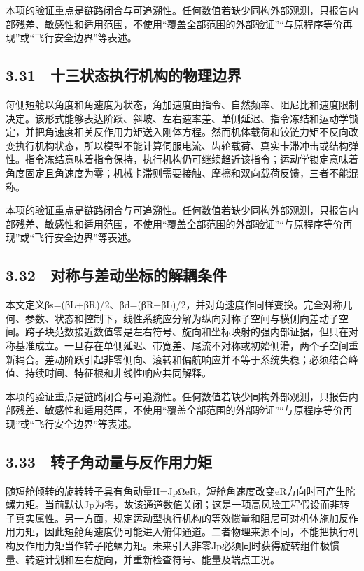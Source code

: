 \documentclass[UTF8,12pt,openany]{ctexbook}
\begin{document}
本项的验证重点是链路闭合与可追溯性。任何数值若缺少同构外部观测，只报告内部残差、敏感性和适用范围，不使用“覆盖全部范围的外部验证”“与原程序等价再现”或“飞行安全边界”等表述。

\subsection{3.31　十三状态执行机构的物理边界}

每侧短舱以角度和角速度为状态，角加速度由指令、自然频率、阻尼比和速度限制决定。该形式能够表达阶跃、斜坡、左右速率差、单侧延迟、指令冻结和运动学锁定，并把角速度相关反作用力矩送入刚体方程。然而机体载荷和铰链力矩不反向改变执行机构状态，所以模型不能计算伺服电流、齿轮载荷、真实卡滞冲击或结构弹性。指令冻结意味着指令保持，执行机构仍可继续趋近该指令；运动学锁定意味着角度固定且角速度为零；机械卡滞则需要接触、摩擦和双向载荷反馈，三者不能混称。

本项的验证重点是链路闭合与可追溯性。任何数值若缺少同构外部观测，只报告内部残差、敏感性和适用范围，不使用“覆盖全部范围的外部验证”“与原程序等价再现”或“飞行安全边界”等表述。

\subsection{3.32　对称与差动坐标的解耦条件}

本文定义βs=(βL+βR)/2、βd=(βR−βL)/2，并对角速度作同样变换。完全对称几何、参数、状态和控制下，线性系统应分解为纵向对称子空间与横侧向差动子空间。跨子块范数接近数值零是左右符号、旋向和坐标映射的强内部证据，但只在对称基准成立。一旦存在单侧延迟、带宽差、尾流不对称或初始侧滑，两个子空间重新耦合。差动阶跃引起非零侧向、滚转和偏航响应并不等于系统失稳；必须结合峰值、持续时间、特征根和非线性响应共同解释。

本项的验证重点是链路闭合与可追溯性。任何数值若缺少同构外部观测，只报告内部残差、敏感性和适用范围，不使用“覆盖全部范围的外部验证”“与原程序等价再现”或“飞行安全边界”等表述。

\subsection{3.33　转子角动量与反作用力矩}

随短舱倾转的旋转转子具有角动量H=JpΩeR，短舱角速度改变eR方向时可产生陀螺力矩。当前默认Jp为零，故该通道数值关闭；这是一项高风险工程假设而非转子真实属性。另一方面，规定运动型执行机构的等效惯量和阻尼可对机体施加反作用力矩，因此短舱角速度仍可能进入俯仰通道。二者物理来源不同，不能把执行机构反作用力矩当作转子陀螺力矩。未来引入非零Jp必须同时获得旋转组件极惯量、转速计划和左右旋向，并重新检查符号、能量及端点工况。
\end{document}
